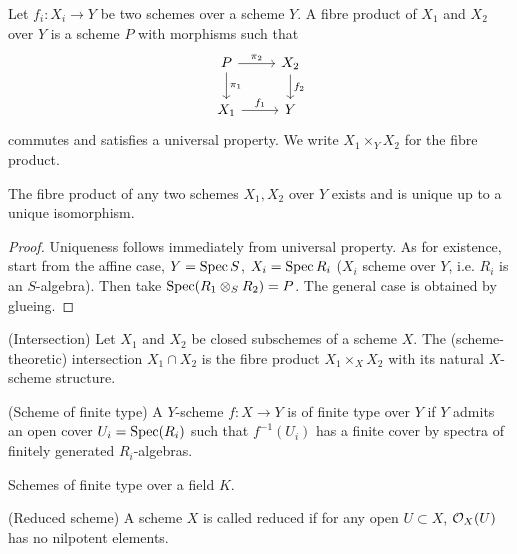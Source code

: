 \documentclass[a4paper,11pt]{article}
\begin{document}
				\begin{defi}
					Let $f_i:X_i\rightarrow Y$ be two schemes over a scheme $Y$. A fibre product of $X_1$ and $X_2$ over $Y$ is a scheme $P$ with morphisms such that
					\begin{equation*}
						\begin{tikzcd}
							P\ar[r,"\pi_2"]\ar[d,"\pi_1"] & X_2\ar[d,"f_2"]\\
							X_1\ar[r,"f_1"] & Y
						\end{tikzcd}
					\end{equation*}
					commutes and satisfies a universal property. We write $X_1\times_YX_2$ for the fibre product.
				\end{defi}

				\begin{prop}
					The fibre product of any two schemes $X_1,X_2$ over $Y$ exists and is unique up to a unique isomorphism.
				\end{prop}
				\begin{proof}
					Uniqueness follows immediately from universal property. As for existence, start from the affine case, $Y=\operatorname{Spec} S$, $X_i=\operatorname{Spec} R_i$ ($X_i$ scheme over $Y$, i.e. $R_i$ is an $S$-algebra). Then take $\operatorname{Spec}(R_1\otimes_SR_2)=P$. The general case is obtained by glueing. 
				\end{proof}

				\begin{defi}(Intersection)
					Let $X_1$ and $X_2$ be closed subschemes of a scheme $X$. The (scheme-theoretic) intersection $X_1\cap X_2$ is the fibre product $X_1\times_XX_2$ with its natural $X$-scheme structure.
				\end{defi}

				\begin{defi}(Scheme of finite type)
					A $Y$-scheme $f:X\rightarrow Y$ is of finite type over $Y$ if $Y$ admits an open cover $U_i=\operatorname{Spec}(R_i)$ such that $f^{-1}(U_i)$ has a finite cover by spectra of finitely generated $R_i$-algebras.
				\end{defi}

				\begin{eg}
					Schemes of finite type over a field $K$.
				\end{eg}

				\begin{defi}(Reduced scheme)
					A scheme $X$ is called reduced if for any open $U\subset X$, $\mathcal{O}_X(U)$ has no nilpotent elements.
				\end{defi}
\end{document}
